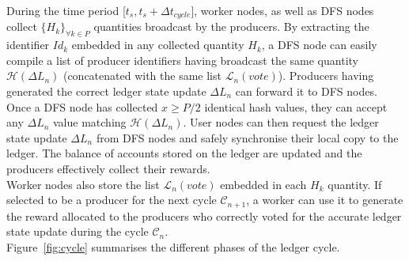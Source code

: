 During the time period [$t_{s}, t_s + \Delta t_{cycle}$], worker nodes, as well as DFS nodes collect $\{H_k\}_{\forall k \in P}$ quantities broadcast by the producers. 
By extracting the identifier $Id_k$ embedded in any collected quantity $H_k$, a DFS node can easily compile a list of producer identifiers having broadcast the same quantity $\mathcal{H}(\Delta L_n)$ (concatenated with the same list $\mathcal{L}_{n}(vote)$). Producers having generated the correct ledger state update $\Delta L_n$ can forward it to DFS nodes. Once a DFS node has collected $x \geq P/2$ identical hash values, they can accept  any $\Delta L_n$ value matching $\mathcal{H}(\Delta L_n)$. User nodes can then request the ledger state update  $\Delta L_n$  from DFS nodes and safely synchronise their local copy to the ledger. The balance of accounts stored on the ledger are updated and the producers effectively collect their rewards. \\

Worker nodes also store the list $\mathcal{L}_{n}(vote)$ embedded in each $H_k$ quantity. If selected to be a producer for the next cycle $\mathcal{C}_{n+1}$, a worker can use it to generate the reward allocated to the producers who correctly voted for the accurate ledger state update during  the cycle $\mathcal{C}_{n}$.\\

Figure~\ref{fig:cycle} summarises the different phases of the ledger cycle.\\

